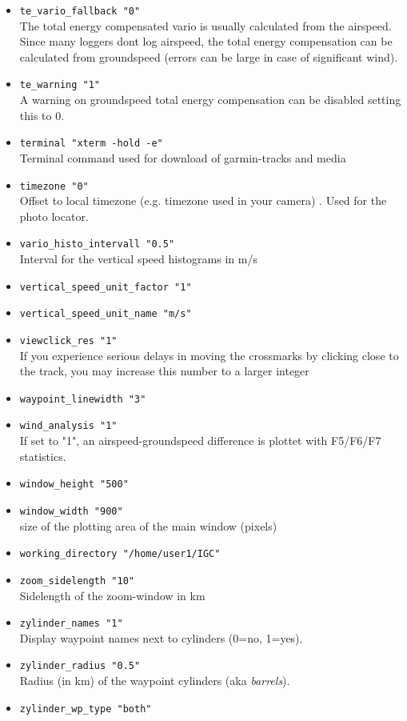 \begin{itemize}
\item \texttt{te\_vario\_fallback "0"}\\
The total energy compensated vario is usually calculated from the airspeed. Since many loggers dont log airspeed,
the total energy compensation can be calculated from groundspeed (errors can be large in case of significant wind).

\item \texttt{te\_warning    "1"}\\
A warning on groundspeed total energy compensation can be disabled setting this to 0.

\item \texttt{terminal	"xterm -hold -e"}\\
Terminal command used for download of garmin-tracks and media

\item \texttt{timezone    "0"}\\
Offset to local timezone (e.g. timezone used in your camera) . Used for the photo locator.

\item \texttt{vario\_histo\_intervall    "0.5"}\\
    Interval for the vertical speed histograms in m/s
\item \texttt{vertical\_speed\_unit\_factor    "1"}
\item \texttt{vertical\_speed\_unit\_name    "m/s"}

\item \texttt{viewclick\_res "1"}\\
	If you experience serious delays in moving the crossmarks by clicking close to the track, you may increase this number to a larger integer

\item \texttt{waypoint\_linewidth    "3"}
\item \texttt{wind\_analysis "1"} \\
If set to "1", an airspeed-groundspeed difference is plottet with F5/F6/F7 statistics.

\item \texttt{window\_height "500"} \\
\item \texttt{window\_width "900"} \\
size of the plotting area of the main window (pixels)


\item \texttt{working\_directory    "/home/user1/IGC"}
\item \texttt{zoom\_sidelength    "10"}\\
    Sidelength of the zoom-window in km

\item \texttt{zylinder\_names    "1"}\\
 Display waypoint names next to cylinders (0=no, 1=yes).
 
\item \texttt{zylinder\_radius    "0.5"}\\
 Radius (in km) of the waypoint cylinders (aka \emph{barrels}).

\item \texttt{zylinder\_wp\_type    "both"}

\end{itemize}
